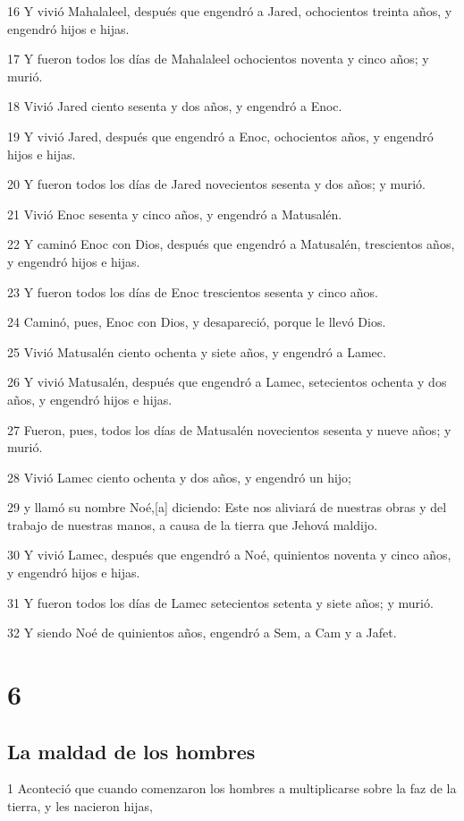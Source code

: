 16 Y vivió Mahalaleel, después que engendró a Jared, ochocientos treinta años, y engendró hijos e hijas.

17 Y fueron todos los días de Mahalaleel ochocientos noventa y cinco años; y murió.

18 Vivió Jared ciento sesenta y dos años, y engendró a Enoc.

19 Y vivió Jared, después que engendró a Enoc, ochocientos años, y engendró hijos e hijas.

20 Y fueron todos los días de Jared novecientos sesenta y dos años; y murió.

21 Vivió Enoc sesenta y cinco años, y engendró a Matusalén.

22 Y caminó Enoc con Dios, después que engendró a Matusalén, trescientos años, y engendró hijos e hijas.

23 Y fueron todos los días de Enoc trescientos sesenta y cinco años.

24 Caminó, pues, Enoc con Dios, y desapareció, porque le llevó Dios.

25 Vivió Matusalén ciento ochenta y siete años, y engendró a Lamec.

26 Y vivió Matusalén, después que engendró a Lamec, setecientos ochenta y dos años, y engendró hijos e hijas.

27 Fueron, pues, todos los días de Matusalén novecientos sesenta y nueve años; y murió.

28 Vivió Lamec ciento ochenta y dos años, y engendró un hijo;

29 y llamó su nombre Noé,[a] diciendo: Este nos aliviará de nuestras obras y del trabajo de nuestras manos, a causa de la tierra que Jehová maldijo.

30 Y vivió Lamec, después que engendró a Noé, quinientos noventa y cinco años, y engendró hijos e hijas.

31 Y fueron todos los días de Lamec setecientos setenta y siete años; y murió.

32 Y siendo Noé de quinientos años, engendró a Sem, a Cam y a Jafet.

\chapter{6}

\section{La maldad de los hombres}

1 Aconteció que cuando comenzaron los hombres a multiplicarse sobre la faz de la tierra, y les nacieron hijas,

